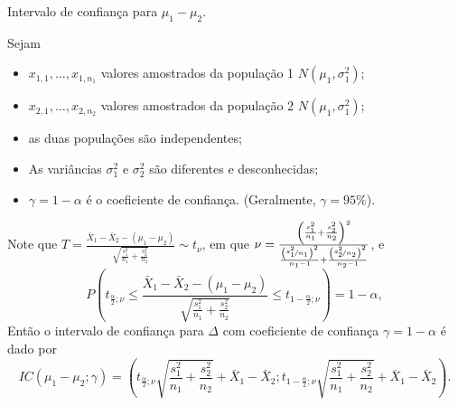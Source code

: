 \documentclass[9pt]{beamer}
\begin{document}
\begin{frame}{Intervalo de confiança para $\mu_1 - \mu_2$.}

\normalsize

Sejam
\begin{itemize}
	\item $x_{1,1}, \dots, x_{1,n_1}$ valores amostrados da população 1 $N(\mu_1, \sigma_1^2)$;
	\item $x_{2,1}, \dots, x_{2,n_2}$ valores amostrados da população 2 $N(\mu_1, \sigma_1^2)$;
	\item as duas populações são independentes;
	\item As variâncias $\sigma_1^2$ e $\sigma_2^2$ são diferentes e desconhecidas; 
	\item $\gamma=1-\alpha$ é o coeficiente de confiança. (Geralmente, $\gamma=95\%$).
\end{itemize}

Note que $T = \frac{\bar{X}_1  - \bar{X}_2 -(\mu_1 - \mu_2) }{\sqrt{\frac{s_1^2}{n_1} + \frac{s_2^2}{n_2}}} \sim t_\nu$, em que $\nu = \frac{\left( \frac{s_1^2}{n_1} + \frac{s_2^2}{n_2} \right)^2}{\frac{\left(\nicefrac{s_1^2}{n_1}\right)^2}{n_1-1} + \frac{\left(\nicefrac{s_2^2}{n_2}\right)^2}{n_2-1}}$, e 
$$P\left( t_{\frac{\alpha}{2}; \nu} \leq \frac{\bar{X}_1  - \bar{X}_2 -(\mu_1 - \mu_2) }{\sqrt{\frac{s_1^2}{n_1} + \frac{s_2^2}{n_2}}} \leq t_{1-\frac{\alpha}{2}; \nu} \right) = 1 - \alpha,$$
Então o intervalo de confiança para $\Delta$ com coeficiente de confiança $\gamma=1-\alpha$ é dado por
{\scriptsize
	$$IC\left(\mu_1 - \mu_2; \gamma\right) = \left( t_{\frac{\alpha}{2}; \nu} \sqrt{\frac{s_1^2}{n_1} + \frac{s_2^2}{n_2}} + \bar{X}_1 - \bar{X}_2; t_{1-\frac{\alpha}{2}; \nu} \sqrt{\frac{s_1^2}{n_1} + \frac{s_2^2}{n_2}} + \bar{X}_1 - \bar{X}_2 \right).$$
}

\normalsize
\end{frame}
\end{document}
